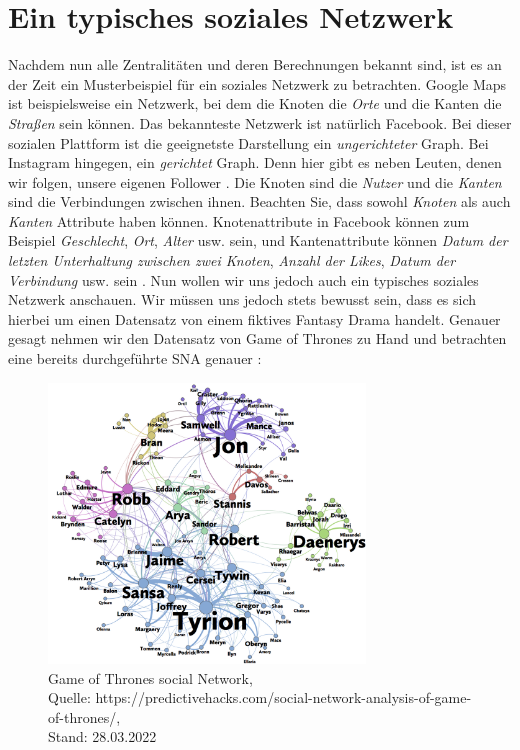 \section{Ein typisches soziales Netzwerk}
Nachdem nun alle Zentralitäten und deren Berechnungen bekannt sind, ist es an der Zeit ein Musterbeispiel für ein soziales Netzwerk zu betrachten. Google Maps ist beispielsweise ein Netzwerk, bei dem die Knoten die \textit{Orte} und die Kanten die \textit{Straßen} sein können. Das bekannteste Netzwerk ist natürlich Facebook. Bei dieser sozialen Plattform ist die geeignetste Darstellung ein \textit{ungerichteter} Graph. Bei Instagram hingegen, ein \textit{gerichtet} Graph. Denn hier gibt es neben Leuten, denen wir folgen, unsere eigenen Follower \cite{fbInsta}. Die Knoten sind die \textit{Nutzer} und die \textit{Kanten} sind die Verbindungen zwischen ihnen. Beachten Sie, dass sowohl \textit{Knoten} als auch \textit{Kanten} Attribute haben können. Knotenattribute in Facebook können zum Beispiel \textit{Geschlecht}, \textit{Ort}, \textit{Alter} usw. sein, und Kantenattribute können \textit{Datum der letzten Unterhaltung zwischen zwei Knoten}, \textit{Anzahl der Likes}, \textit{Datum der Verbindung} usw. sein \cite{GOT}.
Nun wollen wir uns jedoch auch ein typisches soziales Netzwerk anschauen. Wir müssen uns jedoch stets bewusst sein, dass es sich hierbei um einen Datensatz von einem fiktives Fantasy Drama handelt. Genauer gesagt nehmen wir den Datensatz von Game of Thrones zu Hand und betrachten eine bereits durchgeführte SNA genauer \cite{GOT}:

\begin{figure}[h!]
    \centering
    \includegraphics[width=0.75\textwidth]{Graphics/got-network.png}
    \caption{Game of Thrones social Network,\\
    Quelle: https://predictivehacks.com/social-network-analysis-of-game-of-thrones/,\\ Stand: 28.03.2022}
    \label{fig:GameOfThrones}
\end{figure}

